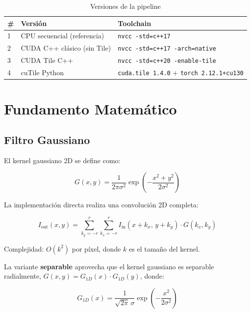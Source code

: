 \documentclass[12pt,a4paper]{article}
\begin{document}
\begin{table}[H]
\centering
\caption{Versiones de la pipeline}
\begin{tabular}{lll}
\toprule
\textbf{\#} & \textbf{Versi\'on} & \textbf{Toolchain} \\
\midrule
1 & CPU secuencial (referencia) & \texttt{nvcc -std=c++17} \\
2 & CUDA C++ cl\'asico (sin Tile) & \texttt{nvcc -std=c++17 -arch=native} \\
3 & CUDA Tile C++ & \texttt{nvcc -std=c++20 -enable-tile} \\
4 & cuTile Python & \texttt{cuda.tile 1.4.0} + \texttt{torch 2.12.1+cu130} \\
\bottomrule
\end{tabular}
\end{table}

\section{Fundamento Matem\'atico}

\subsection{Filtro Gaussiano}

El kernel gaussiano 2D se define como:

\begin{equation}
G(x, y) = \frac{1}{2\pi\sigma^2} \exp\!\left(-\frac{x^2 + y^2}{2\sigma^2}\right)
\end{equation}

La implementaci\'on directa realiza una convoluci\'on 2D completa:

\begin{equation}
I_{\text{out}}(x,y) = \sum_{k_y=-r}^{r} \sum_{k_x=-r}^{r} I_{\text{in}}(x+k_x,\, y+k_y) \cdot G(k_x, k_y)
\end{equation}

Complejidad: $O(k^2)$ por p\'ixel, donde $k$ es el tama\~no del kernel.

La variante \textbf{separable} aprovecha que el kernel gaussiano es separable radialmente, $G(x,y) = G_{1D}(x) \cdot G_{1D}(y)$, donde:

\begin{equation}
G_{1D}(x) = \frac{1}{\sqrt{2\pi}\,\sigma} \exp\!\left(-\frac{x^2}{2\sigma^2}\right)
\end{equation}
\end{document}
